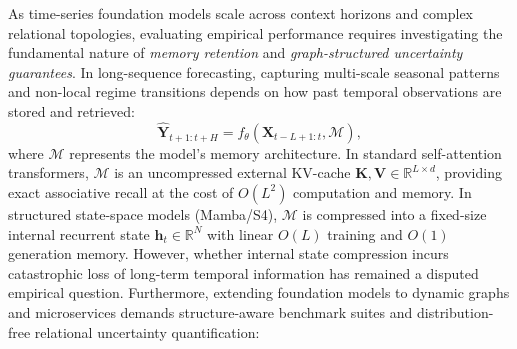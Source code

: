 As time-series foundation models scale across context horizons and complex relational topologies, evaluating empirical performance requires investigating the fundamental nature of \emph{memory retention} and \emph{graph-structured uncertainty guarantees}. In long-sequence forecasting, capturing multi-scale seasonal patterns and non-local regime transitions depends on how past temporal observations are stored and retrieved:
\begin{equation}
    \hat{\mathbf{Y}}_{t+1:t+H} = f_\theta(\mathbf{X}_{t-L+1:t}, \mathcal{M}),
\end{equation}
where $\mathcal{M}$ represents the model's memory architecture. In standard self-attention transformers, $\mathcal{M}$ is an uncompressed external KV-cache $\mathbf{K}, \mathbf{V} \in \mathbb{R}^{L \times d}$, providing exact associative recall at the cost of $O(L^2)$ computation and memory. In structured state-space models (Mamba/S4), $\mathcal{M}$ is compressed into a fixed-size internal recurrent state $\mathbf{h}_t \in \mathbb{R}^N$ with linear $O(L)$ training and $O(1)$ generation memory. However, whether internal state compression incurs catastrophic loss of long-term temporal information has remained a disputed empirical question. Furthermore, extending foundation models to dynamic graphs and microservices demands structure-aware benchmark suites and distribution-free relational uncertainty quantification:

